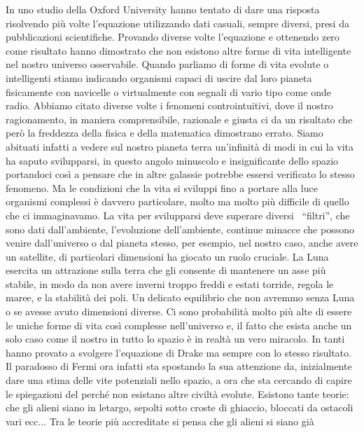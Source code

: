 \documentclass[12pt]{book} %
\begin{document}
In uno studio della Oxford University hanno tentato di dare una risposta
risolvendo più volte l'equazione utilizzando dati casuali, sempre diversi, presi da pubblicazioni scientifiche.
Provando diverse volte l'equazione e ottenendo zero come risultato hanno dimostrato che non
esistono altre forme di vita intelligente nel nostro universo osservabile. Quando parliamo di forme di vita evolute o
intelligenti stiamo indicando organismi capaci di uscire dal loro pianeta fisicamente con navicelle o virtualmente con
segnali di vario tipo come onde radio. Abbiamo citato diverse volte i fenomeni controintuitivi, dove il nostro
ragionamento, in maniera comprensibile, razionale e giusta ci da un risultato che però la freddezza della fisica e
della matematica dimostrano errato. Siamo abituati infatti a vedere sul nostro pianeta terra
un'infinità di modi in cui la vita ha saputo svilupparsi, in questo angolo minuscolo e
insignificante dello spazio portandoci così a pensare che in altre galassie potrebbe essersi verificato lo stesso
fenomeno. Ma le condizioni che la vita si sviluppi fino a portare alla luce organismi complessi è davvero particolare,
molto ma molto più difficile di quello che ci immaginavamo. La vita per svilupparsi deve superare diversi \ “filtri”,
che sono dati dall'ambiente, l'evoluzione dell'ambiente,
continue minacce che possono venire dall'universo o dal pianeta stesso, per esempio, nel nostro
caso, anche avere un satellite, di particolari dimensioni ha giocato un ruolo cruciale. La Luna esercita un attrazione
sulla terra che gli consente di mantenere un asse più stabile, in modo da non avere inverni troppo freddi e estati
torride, regola le maree, e la stabilità dei poli. Un delicato equilibrio che non avremmo senza Luna o se avesse avuto
dimensioni diverse. Ci sono probabilità molto più alte di essere le uniche forme di vita così complesse
nell'universo e, il fatto che esista anche un solo caso come il nostro in tutto lo spazio è in
realtà un vero miracolo. In tanti hanno provato a svolgere l'equazione di Drake ma sempre con lo
stesso risultato. Il paradosso di Fermi ora infatti sta spostando la sua attenzione da, inizialmente dare una stima
delle vite potenziali nello spazio, a ora che sta cercando di capire le spiegazioni del perché non esistano altre
civiltà evolute. Esistono tante teorie: che gli alieni siano {\textquotedbl}in letargo{\textquotedbl}, sepolti sotto
croste di ghiaccio, bloccati da ostacoli vari ecc... Tra le teorie più accreditate si pensa che gli alieni si siano già
\end{document}
